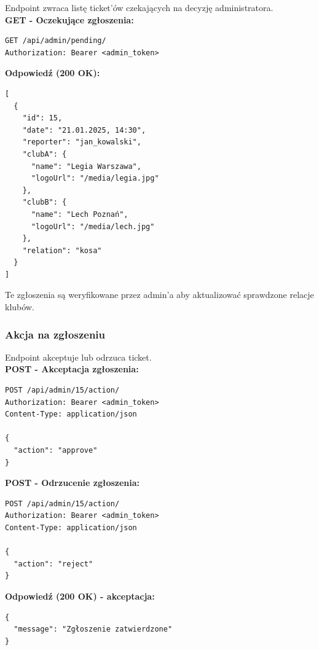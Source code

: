 \documentclass[a4paper,12pt]{article}
\begin{document}
Endpoint zwraca listę ticket'ów czekających na decyzję administratora. \\

\textbf{GET - Oczekujące zgłoszenia:}
\begin{lstlisting}
GET /api/admin/pending/
Authorization: Bearer <admin_token>
\end{lstlisting}

\vspace{0.5cm}

\textbf{Odpowiedź (200 OK):}
\begin{lstlisting}
[
  {
    "id": 15,
    "date": "21.01.2025, 14:30",
    "reporter": "jan_kowalski",
    "clubA": {
      "name": "Legia Warszawa",
      "logoUrl": "/media/legia.jpg"
    },
    "clubB": {
      "name": "Lech Poznań",
      "logoUrl": "/media/lech.jpg"
    },
    "relation": "kosa"
  }
]
\end{lstlisting}

\vspace{0.5cm}

Te zgłoszenia są weryfikowane przez admin'a aby aktualizować sprawdzone relacje klubów.

\newpage

\subsubsection{Akcja na zgłoszeniu}

Endpoint akceptuje lub odrzuca ticket. \\

\textbf{POST - Akceptacja zgłoszenia:}
\begin{lstlisting}
POST /api/admin/15/action/
Authorization: Bearer <admin_token>
Content-Type: application/json

{
  "action": "approve"
}
\end{lstlisting}

\vspace{0.5cm}

\textbf{POST - Odrzucenie zgłoszenia:}
\begin{lstlisting}
POST /api/admin/15/action/
Authorization: Bearer <admin_token>
Content-Type: application/json

{
  "action": "reject"
}
\end{lstlisting}

\vspace{0.5cm}

\textbf{Odpowiedź (200 OK) - akceptacja:}
\begin{lstlisting}
{
  "message": "Zgłoszenie zatwierdzone"
}
\end{lstlisting}
\end{document}
